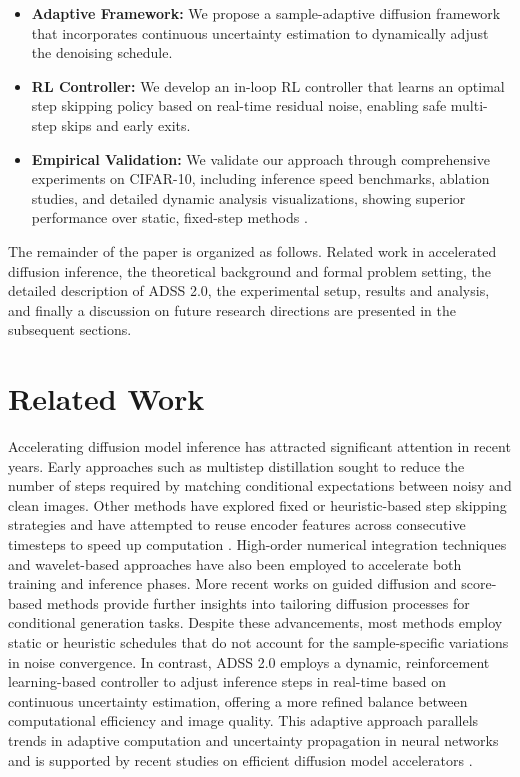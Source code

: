 \documentclass{article} %
\begin{document}
\begin{itemize}
  \item \textbf{Adaptive Framework:} We propose a sample-adaptive diffusion framework that incorporates continuous uncertainty estimation to dynamically adjust the denoising schedule.
  \item \textbf{RL Controller:} We develop an in-loop RL controller that learns an optimal step skipping policy based on real-time residual noise, enabling safe multi-step skips and early exits.
  \item \textbf{Empirical Validation:} We validate our approach through comprehensive experiments on CIFAR-10, including inference speed benchmarks, ablation studies, and detailed dynamic analysis visualizations, showing superior performance over static, fixed-step methods \cite{li2023faster,moon2024simple}.
\end{itemize}

The remainder of the paper is organized as follows. Related work in accelerated diffusion inference, the theoretical background and formal problem setting, the detailed description of ADSS 2.0, the experimental setup, results and analysis, and finally a discussion on future research directions are presented in the subsequent sections.

\section{Related Work}
\label{sec:related}
Accelerating diffusion model inference has attracted significant attention in recent years. Early approaches such as multistep distillation \cite{salimans2024multistep} sought to reduce the number of steps required by matching conditional expectations between noisy and clean images. Other methods have explored fixed or heuristic-based step skipping strategies \cite{xia2023towards} and have attempted to reuse encoder features across consecutive timesteps to speed up computation \cite{li2023faster}. High-order numerical integration techniques \cite{wang2022accelerating,wizadwongsa2023accelerating} and wavelet-based approaches \cite{phung2022wavelet} have also been employed to accelerate both training and inference phases. More recent works on guided diffusion and score-based methods \cite{xu2023semi} provide further insights into tailoring diffusion processes for conditional generation tasks. Despite these advancements, most methods employ static or heuristic schedules that do not account for the sample-specific variations in noise convergence. In contrast, ADSS 2.0 employs a dynamic, reinforcement learning-based controller to adjust inference steps in real-time based on continuous uncertainty estimation, offering a more refined balance between computational efficiency and image quality. This adaptive approach parallels trends in adaptive computation and uncertainty propagation in neural networks and is supported by recent studies on efficient diffusion model accelerators \cite{authorYearEfficient}.
\end{document}
